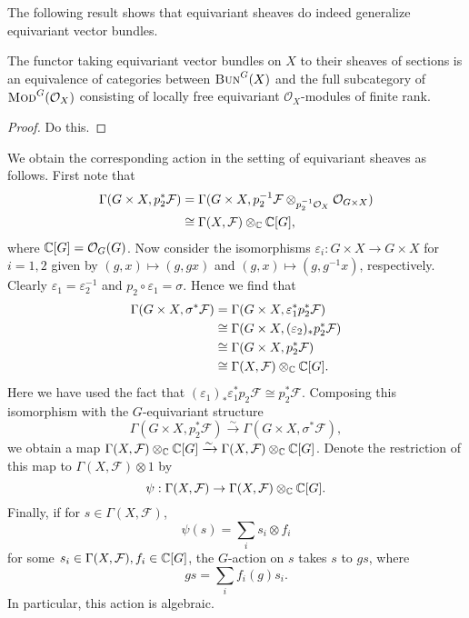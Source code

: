 The following result shows that equivariant sheaves do indeed generalize equivariant vector bundles.

\begin{proposition}
    The functor taking equivariant vector bundles on $X$ to their sheaves of sections
    is an equivalence of categories between $\textsc{Bun}^G(X)$ and the full subcategory of
    $\textsc{Mod}^G(\mathcal{O}_X)$ consisting of locally free equivariant $\mathcal{O}_X$-modules
    of finite rank.
\end{proposition}
\begin{proof}
    Do this.
\end{proof}

We obtain the corresponding action in the setting of equivariant sheaves as follows. First
note that
\begin{align}
    \Gamma(G\times X,p_2^*\mathcal{F}) &= \Gamma(G\times X, p_2^{-1}\mathcal{F}\otimes_{p_2^{-1}\mathcal{O}_X}\mathcal{O}_{G\times X})\nonumber\\
    &\cong \Gamma(X,\mathcal{F}) \otimes_{\mathbb{C}}\mathbb{C}[G],
    \label{eq:pullbacksheaf}
\end{align}
where $\mathbb{C}[G]=\mathcal{O}_G(G)$. Now consider the isomorphisms
$\varepsilon_i:G\times X\to G\times X$ for $i=1,2$ given by $(g,x)\mapsto (g,gx)$ and $(g,x)\mapsto(g,g^{-1}x)$, respectively.
Clearly $\varepsilon_1=\varepsilon_2^{-1}$ and $p_2\circ\varepsilon_1=\sigma$. Hence we find that
\begin{align*}
    \Gamma(G\times X,\sigma^*\mathcal{F}) &= \Gamma(G\times X,\varepsilon_1^*p_2^*\mathcal{F})\\
    &\cong \Gamma(G\times X,(\varepsilon_2)_*p_2^*\mathcal{F})\\
    &\cong \Gamma(G\times X,p_2^*\mathcal{F})\\
    &\cong \Gamma(X,\mathcal{F}) \otimes_{\mathbb{C}}\mathbb{C}[G].
\end{align*}
Here we have used the fact that $(\varepsilon_1)_*\varepsilon_1^*p_2\mathcal{F}\cong p_2^*\mathcal{F}$.
Composing this isomorphism with the $G$-equivariant structure
\[\Gamma(G\times X,p_2^*\mathcal{F})\xrightarrow{\sim}\Gamma(G\times X,\sigma^*\mathcal{F}),\]
we obtain a map $\Gamma(X,\mathcal{F})\otimes_{\mathbb{C}}\mathbb{C}[G]\xrightarrow{\sim}\Gamma(X,\mathcal{F})\otimes_{\mathbb{C}}\mathbb{C}[G]$.
Denote the restriction of this map to $\Gamma(X,\mathcal{F})\otimes 1$ by
\[\psi:\Gamma(X,\mathcal{F})\to\Gamma(X,\mathcal{F})\otimes_{\mathbb{C}}\mathbb{C}[G].\]
Finally, if for $s\in\Gamma(X,\mathcal{F})$,
\[\psi(s)=\sum_i s_i\otimes f_i\]
for some $s_i\in\Gamma(X,\mathcal{F}), f_i\in\mathbb{C}[G]$, the $G$-action on $s$ takes $s$ to $gs$,
where
\[gs=\sum_if_i(g)s_i.\]
In particular, this action is algebraic.

